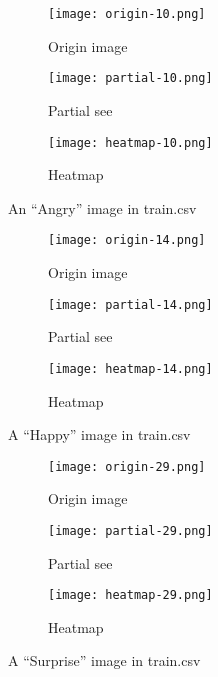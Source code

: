 \documentclass[12pt,a4paper]{extarticle}
\begin{document}
\begin{enumerate}
  \begin{figure}[ht]
    \begin{subfigure}[t]{0.32\textwidth}
      \centering
      \texttt{[image: origin-10.png]}
      \caption{Origin image}
      \label{fig:origin-10}
    \end{subfigure}
    \begin{subfigure}[t]{0.32\textwidth}
      \centering
      \texttt{[image: partial-10.png]}
      \caption{Partial see}
      \label{fig:partial-10}
    \end{subfigure}
    \begin{subfigure}[t]{0.32\textwidth}
      \centering
      \texttt{[image: heatmap-10.png]}
      \caption{Heatmap}
      \label{fig:heatmap-10}
    \end{subfigure}
    \caption{An ``Angry'' image in train.csv}
    \label{fig:image-10-comparison}
  \end{figure}

  \begin{figure}[ht]
    \begin{subfigure}[t]{0.32\textwidth}
      \centering
      \texttt{[image: origin-14.png]}
      \caption{Origin image}
      \label{fig:origin-14}
    \end{subfigure}
    \begin{subfigure}[t]{0.32\textwidth}
      \centering
      \texttt{[image: partial-14.png]}
      \caption{Partial see}
      \label{fig:partial-14}
    \end{subfigure}
    \begin{subfigure}[t]{0.32\textwidth}
      \centering
      \texttt{[image: heatmap-14.png]}
      \caption{Heatmap}
      \label{fig:heatmap-14}
    \end{subfigure}
    \caption{A ``Happy'' image in train.csv}
    \label{fig:image-14-comparison}
  \end{figure}

  \begin{figure}[ht]
    \begin{subfigure}[t]{0.32\textwidth}
      \centering
      \texttt{[image: origin-29.png]}
      \caption{Origin image}
      \label{fig:origin-29}
    \end{subfigure}
    \begin{subfigure}[t]{0.32\textwidth}
      \centering
      \texttt{[image: partial-29.png]}
      \caption{Partial see}
      \label{fig:partial-29}
    \end{subfigure}
    \begin{subfigure}[t]{0.32\textwidth}
      \centering
      \texttt{[image: heatmap-29.png]}
      \caption{Heatmap}
      \label{fig:heatmap-29}
    \end{subfigure}
    \caption{A ``Surprise'' image in train.csv}
    \label{fig:image-29-comparison}
  \end{figure}


\end{enumerate}
\end{document}
